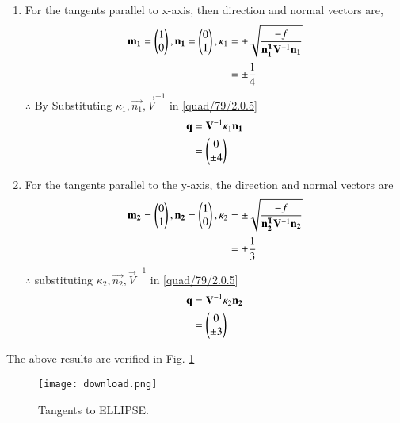 \documentclass[journal,12pt,twocolumn]{IEEEtran}
\begin{document}
\begin{enumerate}
\item For the tangents  parallel to x-axis, then direction and normal vectors are,
\begin{align}
\mathbf{m_1} = \begin{pmatrix}1\\0\end{pmatrix},\mathbf{n_1} = \begin{pmatrix}0\\1\end{pmatrix},
\kappa_1 &=\pm \sqrt{\frac{-f}{\mathbf{n_1^T}\mathbf{V}^{-1}\mathbf{n_1}}} \\
 &=\pm\frac{1}{4}
\end{align}
$\therefore$ By Substituting $\kappa_1,\vec{n_1},\vec{V}^{-1}$ in \eqref{quad/79/2.0.5}
\begin{align}
\mathbf{q}&=\mathbf{V}^{-1}\kappa_1\mathbf{n_1} \\
&=\begin{pmatrix}0\\\pm4\end{pmatrix}
\end{align}
\item For the tangents  parallel to the y-axis, the direction and normal vectors are
\begin{align}
\mathbf{m_2} = \begin{pmatrix}0\\1\end{pmatrix},\mathbf{n_2} = \begin{pmatrix}1\\0\end{pmatrix},
\kappa_2 &=\pm \sqrt{\frac{-f}{\mathbf{n_2^T}\mathbf{V}^{-1}\mathbf{n_2}}} \\
 &=\pm\frac{1}{3}
\end{align}
$\therefore$ substituting $\kappa_2,\vec{n_2},\vec{V}^{-1}$ in \eqref{quad/79/2.0.5}
\begin{align}
\mathbf{q}&=\mathbf{V}^{-1}\kappa_2\mathbf{n_2} \\
&=\begin{pmatrix}0\\\pm3\end{pmatrix}
\end{align}
\end{enumerate}
The above results are verified in Fig.     \ref{quad/79/fig:Tangent to ELLIPSE.}
%
\begin{figure}[!ht]
    \centering
    \texttt{[image: download.png]}
    \caption{Tangents to ELLIPSE.}
    \label{quad/79/fig:Tangent to ELLIPSE.}
\end{figure}  
\end{document}
